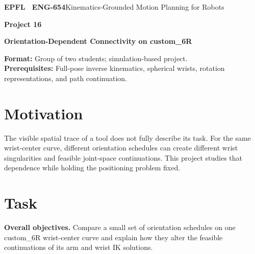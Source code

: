 \documentclass[11pt,a4paper]{article}
\begin{document}
{\small\textbf{EPFL \textbar\ ENG-654}\hfill Kinematics-Grounded Motion Planning for Robots}
\vspace{5mm}

{\color{epflred}\Large\bfseries Project 16}

{\LARGE\bfseries Orientation-Dependent Connectivity on custom\_6R\par}

\textbf{Format:} Group of two students; simulation-based project.\\
\textbf{Prerequisites:} Full-pose inverse kinematics, spherical wrists, rotation representations, and path continuation.

\section*{Motivation}
The visible spatial trace of a tool does not fully describe its task.
For the same wrist-center curve, different orientation schedules can create
different wrist singularities and feasible joint-space continuations. This
project studies that dependence while holding the positioning problem fixed.

\section*{Task}
\textbf{Overall objectives.} Compare a small set of orientation schedules on one custom\_6R
wrist-center curve and explain how they alter the feasible continuations of
its arm and wrist IK solutions.
\end{document}
